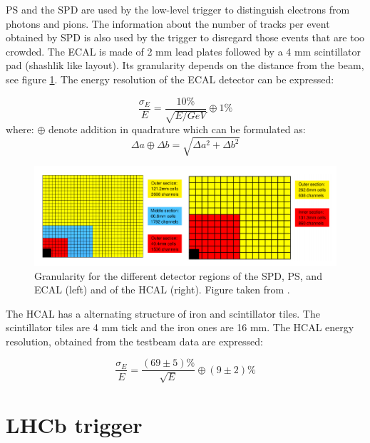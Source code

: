 PS and the SPD are used by the low-level trigger to distinguish electrons from photons and pions. The information about the number of tracks per event obtained by SPD is also used by the trigger to disregard those events that are too crowded. 
The ECAL is made of 2 mm lead plates followed by a 4 mm scintillator pad (shashlik like layout).  Its granularity depends on the distance from the beam, see figure \ref{fig:ECAL}.
The energy resolution of the ECAL detector can be expressed: 

\begin{equation}
    \frac{\sigma_{E}}{E} = \frac{10\%}{\sqrt{E/GeV}} \oplus	 1 \%
\end{equation}
where: $\oplus $ denote addition in quadrature which can be formulated as: 
\begin{equation}
   \Delta a\oplus \Delta b = \sqrt{\Delta a^2 + \Delta b^2} 
\end{equation}


\begin{figure}
\centering
\includegraphics[width=\linewidth]{figures/ECAL.PNG}
\caption{Granularity for the different detector regions of the SPD, PS, and ECAL (left)
and of the HCAL (right). Figure taken from \cite{lhcb}.
\label{fig:ECAL}}
\end{figure}

The HCAL has a alternating structure of iron and scintillator tiles. The scintillator tiles are 4 mm tick and the iron ones are 16 mm. The HCAL energy resolution, obtained from the testbeam data are expressed: 

\begin{equation}
    \frac{\sigma_E}{E} = \frac{(69\pm 5) \%}{\sqrt{E}} \oplus (9\pm 2) \%
\end{equation}
 
\section{LHCb trigger}

